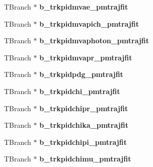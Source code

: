 \begin{DoxyCompactItemize}
\item 
\hypertarget{classanatree_a63a9deeb4d5292fc52be7c3cd0e9a315}{T\-Branch $\ast$ {\bfseries b\-\_\-trkpidmvae\-\_\-pmtrajfit}}\label{classanatree_a63a9deeb4d5292fc52be7c3cd0e9a315}

\item 
\hypertarget{classanatree_a8408bbce06d2e4f22c75ebe5f3370892}{T\-Branch $\ast$ {\bfseries b\-\_\-trkpidmvapich\-\_\-pmtrajfit}}\label{classanatree_a8408bbce06d2e4f22c75ebe5f3370892}

\item 
\hypertarget{classanatree_a3b7f84588633763988e73c91b6fbd9ef}{T\-Branch $\ast$ {\bfseries b\-\_\-trkpidmvaphoton\-\_\-pmtrajfit}}\label{classanatree_a3b7f84588633763988e73c91b6fbd9ef}

\item 
\hypertarget{classanatree_ac793badcec7bba686785d6f9b2b2c746}{T\-Branch $\ast$ {\bfseries b\-\_\-trkpidmvapr\-\_\-pmtrajfit}}\label{classanatree_ac793badcec7bba686785d6f9b2b2c746}

\item 
\hypertarget{classanatree_aa08aff9328f4f4ef62d0e102e49bc7c2}{T\-Branch $\ast$ {\bfseries b\-\_\-trkpidpdg\-\_\-pmtrajfit}}\label{classanatree_aa08aff9328f4f4ef62d0e102e49bc7c2}

\item 
\hypertarget{classanatree_a51107d835cbb9642a5764d9945f63d9c}{T\-Branch $\ast$ {\bfseries b\-\_\-trkpidchi\-\_\-pmtrajfit}}\label{classanatree_a51107d835cbb9642a5764d9945f63d9c}

\item 
\hypertarget{classanatree_ac5a1d422dd967dfe00e3645d422ce49e}{T\-Branch $\ast$ {\bfseries b\-\_\-trkpidchipr\-\_\-pmtrajfit}}\label{classanatree_ac5a1d422dd967dfe00e3645d422ce49e}

\item 
\hypertarget{classanatree_a55878d0d2c89825a394b842aafbd750e}{T\-Branch $\ast$ {\bfseries b\-\_\-trkpidchika\-\_\-pmtrajfit}}\label{classanatree_a55878d0d2c89825a394b842aafbd750e}

\item 
\hypertarget{classanatree_a9ba480fec3a9db28515d7fa626e75053}{T\-Branch $\ast$ {\bfseries b\-\_\-trkpidchipi\-\_\-pmtrajfit}}\label{classanatree_a9ba480fec3a9db28515d7fa626e75053}

\item 
\hypertarget{classanatree_a28b3ca9909ebd571ea848e10de9211c1}{T\-Branch $\ast$ {\bfseries b\-\_\-trkpidchimu\-\_\-pmtrajfit}}\label{classanatree_a28b3ca9909ebd571ea848e10de9211c1}


\end{DoxyCompactItemize}
